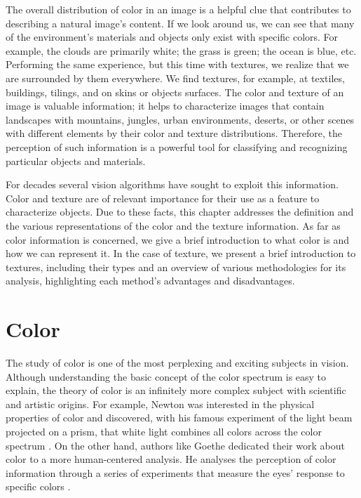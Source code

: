 The overall distribution of color in an image is a helpful clue that contributes to describing a natural image's content. If we look around us, we can see that many of the environment's materials and objects only exist with specific colors. For example, the clouds are primarily white; the grass is green; the ocean is blue, etc. Performing the same experience, but this time with textures, we realize that we are surrounded by them everywhere. We find textures, for example, at textiles, buildings, tilings, and on skins or objects surfaces. The color and texture of an image is valuable information; it helps to characterize images that contain landscapes with mountains, jungles, urban environments, deserts, or other scenes with different elements by their color and texture distributions. Therefore, the perception of such information is a powerful tool for classifying and recognizing particular objects and materials.

For decades several vision algorithms have sought to exploit this information. Color and texture are of relevant importance for their use as a feature to characterize objects. Due to these facts, this chapter addresses the definition and the various representations of the color and the texture information. As far as color information is concerned, we give a brief introduction to what color is and how we can represent it. In the case of texture, we present a brief introduction to textures, including their types and an overview of various methodologies for its analysis, highlighting each method's advantages and disadvantages. 


\section{Color}
The study of color is one of the most perplexing and exciting subjects in vision. Although understanding the basic concept of the color spectrum is easy to explain, the theory of color is an infinitely more complex subject with scientific and artistic origins. For example, Newton was interested in the physical properties of color and discovered, with his famous experiment of the light beam projected on a prism, that white light combines all colors across the color spectrum \citep{Newton:Book:1704}.  On the other hand, authors like Goethe dedicated their work about color to a more human-centered analysis. He analyses the perception of color information through a series of experiments that measure the eyes' response to specific colors \citep{Goethe:Book:2015}.

